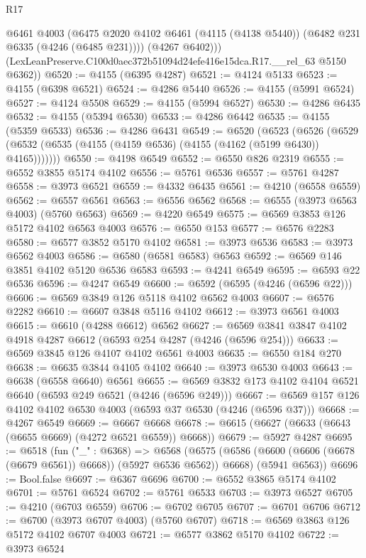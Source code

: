 \begin{lexlean}{R17}
\begin{coremodule}
          @6461
          @4003
          (@6475 @2020 @4102 @6461 (@4115 (@4138 @5440)) (@6482 @231 @6335 (@4246 (@6485 @231))))
          (@4267 @6402)))
      (LexLeanPreserve.C100d0aec372b51094d24efe416e15dca.R17.__rel_63 @5150 @6362))
@6520 := @4155 (@6395 @4287)
@6521 := @4124 @5133
@6523 := @4155 (@6398 @6521)
@6524 := @4286 @5440
@6526 := @4155 (@5991 @6524)
@6527 := @4124 @5508
@6529 := @4155 (@5994 @6527)
@6530 := @4286 @6435
@6532 := @4155 (@5394 @6530)
@6533 := @4286 @6442
@6535 := @4155 (@5359 @6533)
@6536 := @4286 @6431
@6549 := @6520
    (@6523
      (@6526 (@6529 (@6532 (@6535 (@4155 (@4159 @6536) (@4155 (@4162 (@5199 @6430)) @4165)))))))
@6550 := @4198 @6549
@6552 := @6550 @826 @2319
@6555 := @6552 @3855 @5174 @4102
@6556 := @5761 @6536
@6557 := @5761 @4287
@6558 := @3973 @6521
@6559 := @4332 @6435
@6561 := @4210 (@6558 @6559)
@6562 := @6557 @6561
@6563 := @6556 @6562
@6568 := @6555 (@3973 @6563 @4003) (@5760 @6563)
@6569 := @4220 @6549
@6575 := @6569 @3853 @126 @5172 @4102 @6563 @4003
@6576 := @6550 @153
@6577 := @6576 @2283
@6580 := @6577 @3852 @5170 @4102
@6581 := @3973 @6536
@6583 := @3973 @6562 @4003
@6586 := @6580 (@6581 @6583) @6563
@6592 := @6569 @146 @3851 @4102 @5120 @6536 @6583
@6593 := @4241 @6549
@6595 := @6593 @22 @6536
@6596 := @4247 @6549
@6600 := @6592 (@6595 (@4246 (@6596 @22)))
@6606 := @6569 @3849 @126 @5118 @4102 @6562 @4003
@6607 := @6576 @2282
@6610 := @6607 @3848 @5116 @4102
@6612 := @3973 @6561 @4003
@6615 := @6610 (@4288 @6612) @6562
@6627 := @6569 @3841 @3847 @4102 @4918 @4287 @6612 (@6593 @254 @4287 (@4246 (@6596 @254)))
@6633 := @6569 @3845 @126 @4107 @4102 @6561 @4003
@6635 := @6550 @184 @270
@6638 := @6635 @3844 @4105 @4102
@6640 := @3973 @6530 @4003
@6643 := @6638 (@6558 @6640) @6561
@6655 := @6569 @3832 @173 @4102 @4104 @6521 @6640 (@6593 @249 @6521 (@4246 (@6596 @249)))
@6667 := @6569 @157 @126 @4102 @4102 @6530 @4003 (@6593 @37 @6530 (@4246 (@6596 @37)))
@6668 := @4267 @6549
@6669 := @6667 @6668
@6678 := @6615 (@6627 (@6633 (@6643 (@6655 @6669) (@4272 @6521 @6559)) @6668))
@6679 := @5927 @4287
@6695 := @6518
    (fun ("_" : @6368) =>
    @6568
      (@6575 (@6586 (@6600 (@6606 (@6678 (@6679 @6561)) @6668)) (@5927 @6536 @6562)) @6668)
      (@5941 @6563))
@6696 := Bool.false
@6697 := @6367 @6696
@6700 := @6552 @3865 @5174 @4102
@6701 := @5761 @6524
@6702 := @5761 @6533
@6703 := @3973 @6527
@6705 := @4210 (@6703 @6559)
@6706 := @6702 @6705
@6707 := @6701 @6706
@6712 := @6700 (@3973 @6707 @4003) (@5760 @6707)
@6718 := @6569 @3863 @126 @5172 @4102 @6707 @4003
@6721 := @6577 @3862 @5170 @4102
@6722 := @3973 @6524

\end{coremodule}
\end{lexlean}
